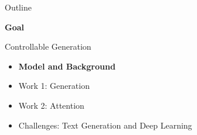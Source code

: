 
\begin{frame}{Outline}
  \begin{center}
    \textbf{Goal}


    Controllable Generation
  \end{center}
  \pause
  \air


  \begin{itemize}
  \item \textbf{Model and Background}
    \air
  \item Work 1: Generation
    \air

  \item Work 2: Attention
    \air

  \item Challenges: Text Generation and Deep Learning
  \end{itemize}
\end{frame}







